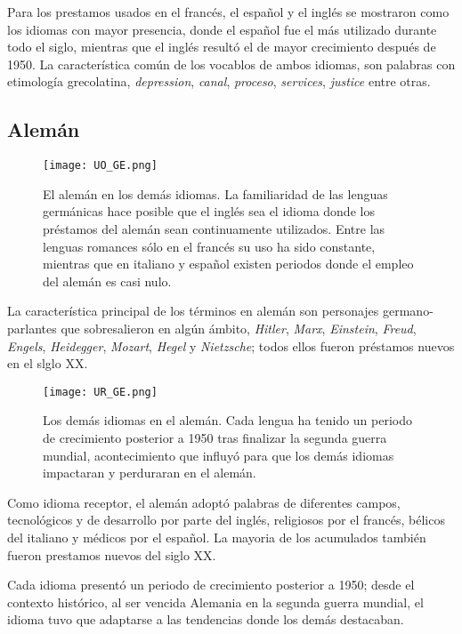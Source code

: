Para los prestamos usados en el francés, el español y el inglés se mostraron como los idiomas con mayor presencia, donde el español fue el más utilizado durante todo el siglo, mientras que el inglés resultó el de mayor crecimiento después de 1950. La característica común de los vocablos de ambos idiomas, son palabras con etimología grecolatina,  \textit{depression}, \textit{canal}, \textit{proceso}, \textit{services}, \textit{justice} entre otras. 



\subsection{Alemán} %

\begin{figure}[h!]
	\centering
	\texttt{[image: UO\_GE.png]}
	\caption{El alemán en los demás idiomas. La familiaridad de las lenguas germánicas hace posible que el inglés sea el idioma  donde los préstamos del alemán sean continuamente utilizados. Entre las lenguas romances sólo en el francés su uso ha sido constante, mientras que en italiano y español existen periodos donde el empleo del alemán es casi nulo.}
	\label{fig.UO_GE}

\end{figure}

La característica principal de los términos en alemán son personajes germano-parlantes que sobresalieron en algún ámbito, \textit{Hitler}, \textit{Marx}, \textit{Einstein}, \textit{Freud}, \textit{Engels}, \textit{Heidegger}, \textit{Mozart}, \textit{Hegel} y \textit{Nietzsche}; todos ellos fueron préstamos nuevos en el slglo XX. 


\begin{figure}[h!]
	\centering
	\texttt{[image: UR\_GE.png]}
	\caption{Los demás idiomas en el alemán. Cada lengua ha tenido un periodo de crecimiento posterior a 1950 tras finalizar la segunda guerra mundial, acontecimiento que influyó para que los demás idiomas impactaran y perduraran en el alemán.}
	\label{fig.UR_GE}
\end{figure}

Como idioma receptor, el alemán adoptó palabras de diferentes campos, tecnológicos y de desarrollo por parte del inglés,  religiosos  por el francés, bélicos del italiano y médicos por el español. La mayoria de los acumulados también fueron prestamos nuevos del siglo XX. 

Cada idioma presentó un periodo de crecimiento posterior a 1950; desde el contexto histórico, al ser vencida Alemania en la segunda guerra mundial, el idioma tuvo que adaptarse a las tendencias donde los demás destacaban. 



